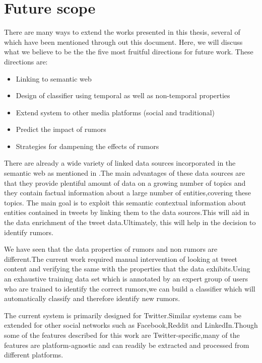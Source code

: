 \section{Future scope}
There are many ways to extend the works presented in this thesis, several of which have been mentioned through out this document. Here, we will discuss what we believe to be
the the five most fruitful directions for future work. These directions are:
\begin{itemize}
	\item Linking to semantic web
	\item Design of classifier using temporal as well as non-temporal properties
	\item Extend system to other media platforms (social and traditional)
	\item Predict the impact of rumors
	\item Strategies for dampening the effects of rumors
\end{itemize}
	There are already a wide variety of linked data sources incorporated in the semantic web as mentioned in \cite{bontcheva2012making} .The main advantages of these data sources are that they provide plentiful amount of data on a growing number of topics and  they contain factual information about a large number of entities,covering these topics. The main goal is to exploit this semantic contextual information about entities contained in tweets by linking them to the data sources.This will aid in the data enrichment of the tweet data.Ultimately, this will help in the decision to identify rumors. 
    \\
    \par
    We have seen that the data properties of rumors and non rumors are different.The current work required manual intervention of looking at tweet content and verifying the same with the properties that the data exhibits.Using an exhaustive training data set which is annotated by an expert group of users who are trained to identify the correct rumors,we can build a classifier which will  automatically classify and therefore identify new rumors.
    \\
    \par	
	The current system is primarily designed for Twitter.Similar systems cam be extended for other social networks such as Facebook,Reddit and LinkedIn.Though some of the features described for this work are Twitter-specific,many of the features are platform-agnostic and can readily be extracted and processed from different platforms.
	\\
